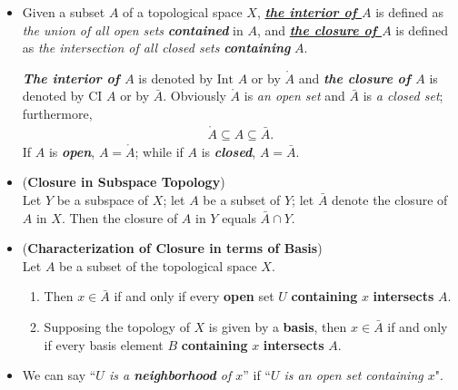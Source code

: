 \documentclass[11pt]{article}
\begin{document}
\begin{itemize}
\item \begin{definition}
Given a subset $A$ of a topological space $X$, \underline{\emph{\textbf{the interior of $A$}}} is defined as \emph{the union of all open sets} \emph{\textbf{contained}} in $A$, and \underline{\emph{\textbf{the closure of $A$}}} is defined as \emph{the intersection of all closed sets} \emph{\textbf{containing}} $A$.

\emph{\textbf{The interior of $A$}} is denoted by $\text{Int }A$ or by $\mathring{A}$ and \emph{\textbf{the closure of $A$}} is denoted by $\text{CI }A$ or
by $\bar{A}$. Obviously $\mathring{A}$ is \emph{an open set} and $\bar{A}$ is \emph{a closed set}; furthermore,
\begin{align*}
\mathring{A} \subseteq A \subseteq \bar{A}.
\end{align*}
If $A$ is \emph{\textbf{open}}, $A = \mathring{A}$; while if $A$ is \emph{\textbf{closed}}, $A = \bar{A}$.
\end{definition}

\item \begin{proposition} (\textbf{Closure in Subspace Topology})\\
Let $Y$ be a subspace of $X$; let $A$ be a subset of $Y$; let $\bar{A}$ denote the closure of $A$ in $X$. Then the closure of $A$ in $Y$ equals $\bar{A} \cap Y$.
\end{proposition}

\item \begin{proposition} (\textbf{Characterization of Closure in terms of Basis}) \citep{munkres2000topology} \\
Let $A$ be a subset of the topological space $X$.
\begin{enumerate}
\item Then $x \in \bar{A}$ if and only if every \textbf{open} set $U$ \textbf{containing} $x$ \textbf{intersects} $A$.
\item Supposing the topology of $X$ is given by a \textbf{basis}, then $x \in \bar{A}$ if and only if every basis element $B$ \textbf{containing} $x$ \textbf{intersects} $A$.
\end{enumerate}
\end{proposition}

\item \begin{remark}
We can say ``\emph{$U$ is a \textbf{neighborhood} of $x$}'' if ``\emph{$U$ is an open set containing $x$}".
\end{remark}


\end{itemize}
\end{document}
